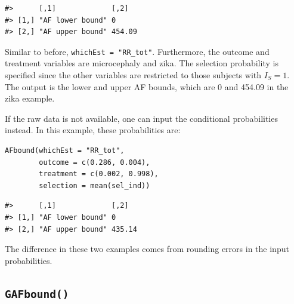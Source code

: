 \begin{verbatim}
#>      [,1]             [,2]  
#> [1,] "AF lower bound" 0     
#> [2,] "AF upper bound" 454.09
\end{verbatim}

Similar to before, \texttt{whichEst\ =\ "RR\_tot"}. Furthermore, the outcome and treatment
variables are microcephaly and zika. The selection probability is specified
since the other variables are restricted to those subjects with \(I_S=1\). The
output is the lower and upper AF bounds, which are 0 and 454.09 in the zika
example.

If the raw data is not available, one can input the conditional probabilities
instead. In this example, these probabilities are:

\begin{verbatim}
AFbound(whichEst = "RR_tot",
        outcome = c(0.286, 0.004),
        treatment = c(0.002, 0.998),
        selection = mean(sel_ind))
\end{verbatim}

\begin{verbatim}
#>      [,1]             [,2]  
#> [1,] "AF lower bound" 0     
#> [2,] "AF upper bound" 435.14
\end{verbatim}

The difference in these two examples comes from rounding errors in the input
probabilities.

\subsection{\texorpdfstring{\texttt{GAFbound()}}{GAFbound()}}\label{gafbound}

